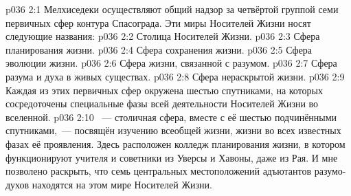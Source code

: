 \vs p036 2:1 Мелхиседеки осуществляют общий надзор за четвёртой группой семи первичных сфер контура Спасограда. Эти миры Носителей Жизни носят следующие названия:
\vs p036 2:2 Столица Носителей Жизни.
\vs p036 2:3 Сфера планирования жизни.
\vs p036 2:4 Сфера сохранения жизни.
\vs p036 2:5 Сфера эволюции жизни.
\vs p036 2:6 Сфера жизни, связанной с разумом.
\vs p036 2:7 Сфера разума и духа в живых существах.
\vs p036 2:8 Сфера нераскрытой жизни.
\vs p036 2:9 \pc Каждая из этих первичных сфер окружена шестью спутниками, на которых сосредоточены специальные фазы всей деятельности Носителей Жизни во вселенной.
\vs p036 2:10 \pc {}~--- столичная сфера, вместе с её шестью подчинёнными спутниками,~--- посвящён изучению всеобщей жизни, жизни во всех известных фазах её проявления. Здесь расположен колледж планирования жизни, в котором функционируют учителя и советники из Уверсы и Хавоны, даже из Рая. И мне позволено раскрыть, что семь центральных местоположений адъютантов разумо\hyp{}духов находятся на этом мире Носителей Жизни.
